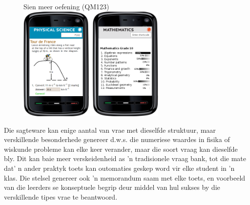 {\begin{figure}[H]
\begin{center}
Sien meer oefening  (QM123)\\ 
\includegraphics[width=0.65\textwidth]{../title_images/practicephones.png}
\end{center}
\end{figure}
\par
Die sagteware kan enige aantal van vrae met dieselfde struktuur, maar verskillende besonderhede genereer d.w.s. die numeriese waardes in fisika of wiskunde probleme kan elke keer verander, maar die soort vraag kan dieselfde bly. Dit kan baie meer verskeidenheid as 'n tradisionele vraag bank, tot die mate dat' n ander praktyk toets kan outomaties geskep word vir elke student in 'n klas. Die stelsel genereer ook 'n memorandum saam met elke toets, en voorbeeld van die leerders se konseptuele begrip deur middel van hul sukses by die verskillende tipes vrae te beantwoord. 
\par

}
